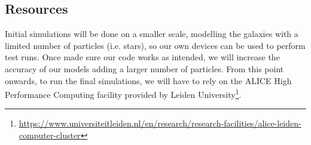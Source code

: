 \documentclass[10pt,english]{article}
\begin{document}

\subsection{Resources}
\label{resources}
Initial simulations will be done on a smaller scale, modelling the galaxies with a limited number of particles (i.e. stars), so our own devices can be used to perform test runs. Once made sure our code works as intended, we will increase the accuracy of our models adding a larger number of particles. From this point onwards, to run the final simulations, we will have to rely on the ALICE High Performance Computing facility provided by Leiden University\footnote{\url{https://www.universiteitleiden.nl/en/research/research-facilities/alice-leiden-computer-cluster}}.\par
\smallskip
\end{document}

